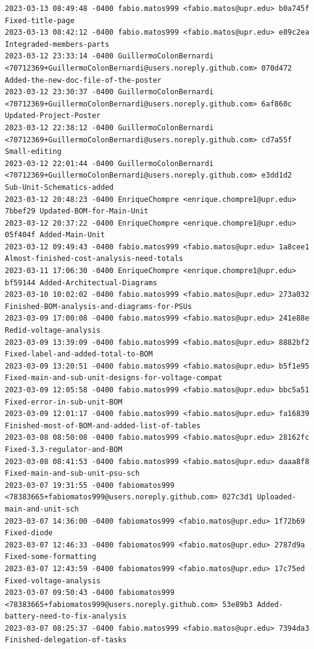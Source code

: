 \documentclass[12pt]{article}
\begin{document}
\begin{lstlisting}
2023-03-13 08:49:48 -0400 fabio.matos999 <fabio.matos@upr.edu> b0a745f Fixed-title-page
2023-03-13 08:42:12 -0400 fabio.matos999 <fabio.matos@upr.edu> e89c2ea Integraded-members-parts
2023-03-12 23:33:14 -0400 GuillermoColonBernardi <70712369+GuillermoColonBernardi@users.noreply.github.com> 070d472 Added-the-new-doc-file-of-the-poster
2023-03-12 23:30:37 -0400 GuillermoColonBernardi <70712369+GuillermoColonBernardi@users.noreply.github.com> 6af860c Updated-Project-Poster
2023-03-12 22:38:12 -0400 GuillermoColonBernardi <70712369+GuillermoColonBernardi@users.noreply.github.com> cd7a55f Small-editing
2023-03-12 22:01:44 -0400 GuillermoColonBernardi <70712369+GuillermoColonBernardi@users.noreply.github.com> e3dd1d2 Sub-Unit-Schematics-added
2023-03-12 20:48:23 -0400 EnriqueChompre <enrique.chompre1@upr.edu> 7bbef29 Updated-BOM-for-Main-Unit
2023-03-12 20:37:22 -0400 EnriqueChompre <enrique.chompre1@upr.edu> 05f404f Added-Main-Unit
2023-03-12 09:49:43 -0400 fabio.matos999 <fabio.matos@upr.edu> 1a8cee1 Almost-finished-cost-analysis-need-totals
2023-03-11 17:06:30 -0400 EnriqueChompre <enrique.chompre1@upr.edu> bf59144 Added-Architectual-Diagrams
2023-03-10 10:02:02 -0400 fabio.matos999 <fabio.matos@upr.edu> 273a032 Finished-BOM-analysis-and-diagrams-for-PSUs
2023-03-09 17:00:08 -0400 fabio.matos999 <fabio.matos@upr.edu> 241e88e Redid-voltage-analysis
2023-03-09 13:39:09 -0400 fabio.matos999 <fabio.matos@upr.edu> 8882bf2 Fixed-label-and-added-total-to-BOM
2023-03-09 13:20:51 -0400 fabio.matos999 <fabio.matos@upr.edu> b5f1e95 Fixed-main-and-sub-unit-designs-for-voltage-compat
2023-03-09 12:05:58 -0400 fabio.matos999 <fabio.matos@upr.edu> bbc5a51 Fixed-error-in-sub-unit-BOM
2023-03-09 12:01:17 -0400 fabio.matos999 <fabio.matos@upr.edu> fa16839 Finished-most-of-BOM-and-added-list-of-tables
2023-03-08 08:50:08 -0400 fabio.matos999 <fabio.matos@upr.edu> 28162fc Fixed-3.3-regulator-and-BOM
2023-03-08 08:41:53 -0400 fabio.matos999 <fabio.matos@upr.edu> daaa8f8 Fixed-main-and-sub-unit-psu-sch
2023-03-07 19:31:55 -0400 fabiomatos999 <78383665+fabiomatos999@users.noreply.github.com> 027c3d1 Uploaded-main-and-unit-sch
2023-03-07 14:36:00 -0400 fabiomatos999 <fabio.matos@upr.edu> 1f72b69 Fixed-diode
2023-03-07 12:46:33 -0400 fabiomatos999 <fabio.matos@upr.edu> 2787d9a Fixed-some-formatting
2023-03-07 12:43:59 -0400 fabiomatos999 <fabio.matos@upr.edu> 17c75ed Fixed-voltage-analysis
2023-03-07 09:50:43 -0400 fabiomatos999 <78383665+fabiomatos999@users.noreply.github.com> 53e89b3 Added-battery-need-to-fix-analysis
2023-03-07 08:25:37 -0400 fabio.matos999 <fabio.matos@upr.edu> 7394da3 Finished-delegation-of-tasks

\end{lstlisting}
\end{document}
